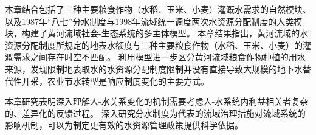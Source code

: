 本章结合包括了三种主要粮食作物（水稻、玉米、小麦）灌溉水需求的自然模块、以及1987年``八七''分水制度与1998年流域统一调度两次水资源分配制度的人类模块，构建了黄河流域社会-生态系统的多主体模型。
本章结果指出，黄河流域的水资源分配制度所规定的地表水额度与三种主要粮食作物（水稻、玉米、小麦）的灌溉需求之间存在时空不匹配。
利用模型进一步区分黄河流域粮食作物种植的用水来源，发现限制地表取水的水资源分配制度限制并没有直接导致大规模的地下水替代性开采，农业节水转型是响应制度变化的主要方式。

本章研究表明深入理解人-水关系变化的机制需要考虑人-水系统内利益相关者复杂的、差异化的反馈过程。
深入研究分水制度为代表的流域治理措施对流域系统的影响机制，可以为制定更有效的水资源管理政策提供科学依据。
